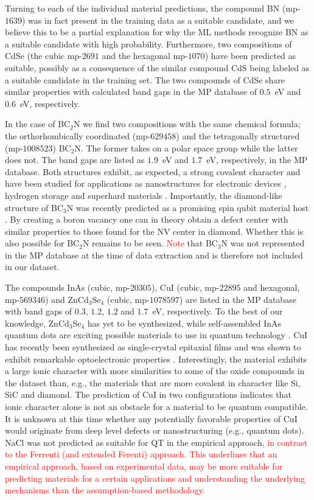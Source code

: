 \documentclass[superscriptaddress,unsortedaddress,
 amsmath,amssymb,
 aps,
]{revtex4-2}
\newcommand{\mrk}[1]{\textcolor{red}{#1}}
\begin{document}
Turning to each of the individual material predictions, the compound BN (mp-$1639$) was in fact present in the training data as a suitable candidate, and we believe this to be a partial explanation for why the ML methods recognize BN as a suitable candidate with high probability. Furthermore, two compositions of CdSe (the cubic mp-$2691$ and the hexagonal mp-$1070$) have been predicted as suitable, possibly as a consequence of the similar compound CdS being labeled as a suitable candidate in the training set. 
The two compounds of CdSe share similar properties with calculated band gaps in the MP database of $0.5$~eV and $0.6$~eV, respectively. 

In the case of BC$_2$N we find two compositions with the same chemical formula; the orthorhombically coordinated (mp-$629458$) and the tetragonally structured (mp-$1008523$) BC$_2$N. The former takes on a polar space group while the latter does not. The band gaps are listed as $1.9$~eV and $1.7$~eV, respectively, in the MP database. Both structures exhibit, as expected, a strong covalent character and have been studied for applications as nanostructures for electronic devices \cite{Gao2017}, hydrogen storage \cite{Cai2017} and superhard materials \cite{Li2017, Jiang2020}. Importantly, the diamond-like structure of BC$_3$N was recently predicted as a promising  spin qubit material host \cite{Wang2020SpinQB}. By creating a boron vacancy one can in theory obtain a defect center with similar properties to those found for the NV center in diamond. Whether this is also possible for BC$_2$N remains to be seen. \mrk{Note} that BC$_3$N was not represented in the MP database at the time of data extraction and is therefore not included in our dataset. 

The compounds InAs (cubic, mp-$20305$), CuI (cubic, mp-$22895$ and hexagonal, mp-$569346$) and ZnCd$_3$Se$_4$ (cubic, mp-$1078597$) are listed in the MP database with band gaps of $0.3$, $1.2$, $1.2$ and $1.7$~eV, respectively. 
To the best of our knowledge, ZnCd$_3$Se$_4$ has yet to be synthesized, while self-assembled InAs quantum dots are  exciting possible materials to use in quantum technology \cite{Liu2018}. 
CuI has recently been synthesized as single-crystal epitaxial films and was shown to exhibit remarkable optoelectronic properties \cite{Ahn2020}. Interestingly, the material exhibits a large ionic character with more similarities to some of the oxide compounds in the dataset than, e.g., the materials that are more covalent in character like Si, SiC and  diamond.  
The prediction of CuI in two configurations indicates that ionic character alone is not an obstacle for a material to be quantum compatible. It is unknown at this time whether any potentially favorable properties of CuI would originate from deep level defects or  nanostructuring (e.g., quantum dots). NaCl was not predicted as suitable for QT in the empirical approach\mrk{, in contrast to the Ferrenti (and extended Ferenti) approach. This underlines that an empirical approach, based on experimental data, may be more suitable for predicting materials for a certain applications and understanding the underlying mechanisms than the assumption-based methodology.}  
\end{document}
